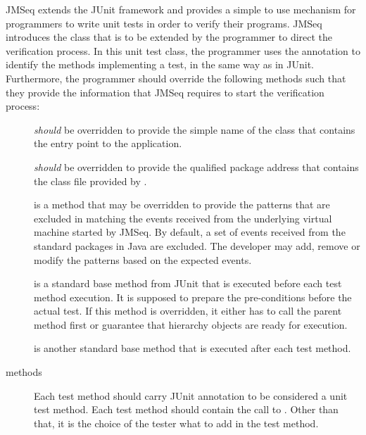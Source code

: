 JMSeq extends the JUnit framework and provides a simple to use mechanism for programmers to write unit tests in order to verify their programs. 
JMSeq introduces the  class that is to be extended by the programmer to direct the verification  process.
In this unit test class, the programmer uses the  annotation to identify the methods implementing a test, in the same way as in JUnit.
Furthermore, the programmer should override the following methods such that they provide the  information that JMSeq requires to start the verification process:
\begin{description}
  \item[] \emph{should} be overridden to provide
the simple name of the class that contains the entry point to the
application. 
  \item[] \emph{should} be overridden to
provide the qualified package address that contains the class file
provided by .
  \item[] is a method that
may be overridden to provide the patterns that are excluded in matching
the events received from the underlying virtual machine started by
JMSeq. By default, a set of events
received from the standard packages in Java are excluded. The developer
may add, remove or modify the patterns based on the expected events.


  \item[] is a standard base method from JUnit that is
executed before each test method execution. It is supposed to prepare
the pre-conditions before the actual test. If this method is overridden,
it either has to call the parent method first or guarantee that
hierarchy objects are ready for execution.
  \item[] is another standard base method that is
executed after each test method.
  \item[ methods] Each test method should carry
 JUnit annotation to be considered a unit test method.
Each test method should contain the call to .
Other than that, it is the choice of the tester what to add in the test
method.
\end{description}

